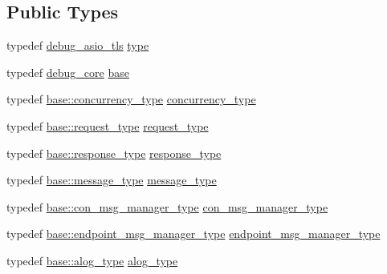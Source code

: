 \subsection*{Public Types}
\begin{DoxyCompactItemize}
\item 
typedef \hyperlink{structwebsocketpp_1_1config_1_1debug__asio__tls}{debug\+\_\+asio\+\_\+tls} \hyperlink{structwebsocketpp_1_1config_1_1debug__asio__tls_a27552c8bb63f5e5c4842be762a85739d}{type}
\item 
typedef \hyperlink{structwebsocketpp_1_1config_1_1debug__core}{debug\+\_\+core} \hyperlink{structwebsocketpp_1_1config_1_1debug__asio__tls_acb62b8218a7ef96b4a879a06abcd3ebc}{base}
\item 
typedef \hyperlink{structwebsocketpp_1_1config_1_1debug__core_aada73b9183fc032c25178870dbb4d83d}{base\+::concurrency\+\_\+type} \hyperlink{structwebsocketpp_1_1config_1_1debug__asio__tls_a22690e0b288bab2b1c14abcf6b3f445c}{concurrency\+\_\+type}
\item 
typedef \hyperlink{structwebsocketpp_1_1config_1_1debug__core_a597de872d5a5b6e9bd2fa1af18ccbbc6}{base\+::request\+\_\+type} \hyperlink{structwebsocketpp_1_1config_1_1debug__asio__tls_ac3023568109156bf336d2c5cd6ba2cd7}{request\+\_\+type}
\item 
typedef \hyperlink{structwebsocketpp_1_1config_1_1debug__core_aa11255cb23f43afb8884bc464aa5c572}{base\+::response\+\_\+type} \hyperlink{structwebsocketpp_1_1config_1_1debug__asio__tls_ae6a55da5913e5fd46997233da3c31c0b}{response\+\_\+type}
\item 
typedef \hyperlink{structwebsocketpp_1_1config_1_1debug__core_ac17c81ad59c265eed87e3e25944c9fbf}{base\+::message\+\_\+type} \hyperlink{structwebsocketpp_1_1config_1_1debug__asio__tls_a9cb98a6f60894bc59c2775a982121bfe}{message\+\_\+type}
\item 
typedef \hyperlink{structwebsocketpp_1_1config_1_1debug__core_a7054f79ccb00e2269e3c9fa1061126ac}{base\+::con\+\_\+msg\+\_\+manager\+\_\+type} \hyperlink{structwebsocketpp_1_1config_1_1debug__asio__tls_a6ccadcf2290d1c3cb58a5da5e51517e1}{con\+\_\+msg\+\_\+manager\+\_\+type}
\item 
typedef \hyperlink{structwebsocketpp_1_1config_1_1debug__core_a02b1cc8ce11213011104049aeba57866}{base\+::endpoint\+\_\+msg\+\_\+manager\+\_\+type} \hyperlink{structwebsocketpp_1_1config_1_1debug__asio__tls_a2457bf3a910a01c162fffe78bf120cc7}{endpoint\+\_\+msg\+\_\+manager\+\_\+type}
\item 
typedef \hyperlink{structwebsocketpp_1_1config_1_1debug__core_a2e57e38001385110ce0fbbd17af6b0af}{base\+::alog\+\_\+type} \hyperlink{structwebsocketpp_1_1config_1_1debug__asio__tls_a317d8aab94f5283aa99873ce93eac381}{alog\+\_\+type}

\end{DoxyCompactItemize}

